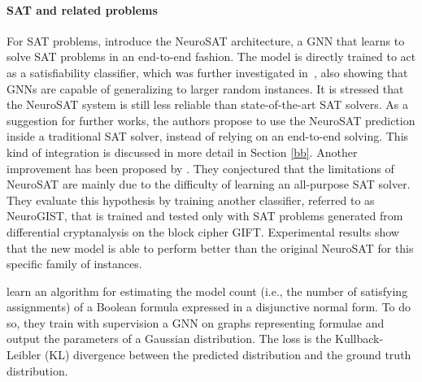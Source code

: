 \documentclass[twoside,11pt]{article}
\begin{document}
\paragraph{SAT and related problems}
For SAT problems, \citet{Sel+2019} introduce the NeuroSAT architecture, a GNN that learns to solve SAT problems in an end-to-end fashion.
The model is directly trained to act as a satisfiability classifier, which was further investigated in~\cite{Cam+2020}, also showing that GNNs are capable of generalizing to larger random instances.
It is stressed that the NeuroSAT system is still less reliable than state-of-the-art SAT solvers.
As a suggestion for further works, the authors propose to use the NeuroSAT prediction inside a traditional SAT solver,
instead of relying on an end-to-end solving. 
This kind of integration is discussed in more detail in Section \ref{bb}.
Another improvement has been proposed by \citet{sun2020neurogift}. They conjectured
that the limitations of NeuroSAT are mainly due to the difficulty of learning an all-purpose SAT solver.
They evaluate this hypothesis by training another classifier, referred to as NeuroGIST, that is trained and tested 
only with SAT problems generated from differential cryptanalysis on the block cipher GIFT. 
Experimental results show that the new model is able to perform better than the original NeuroSAT for this
specific family of instances.

\citet{abboud2020learning} learn an algorithm for estimating the model count (i.e., the number of satisfying assignments) of a Boolean formula expressed in a disjunctive normal form. To do so, they train with supervision a GNN on graphs representing formulae and output the parameters of a Gaussian distribution. The loss is the Kullback-Leibler (KL) divergence between the predicted distribution and the ground truth distribution. 
\end{document}
